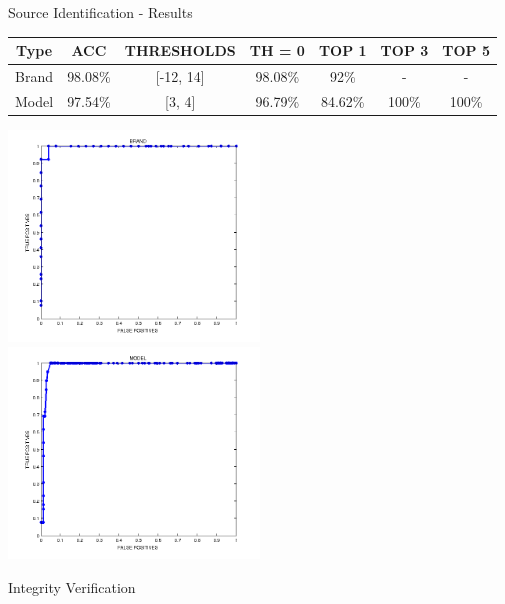 \begin{tframe}{Source Identification - Results}

\begin{footnotesize}
\begin{table}[h!]
\centering
\begin{tabular}{c c c c c c c} 
\hline \hline 
\textbf{Type} & \textbf{ACC} & \textbf{THRESHOLDS} & \textbf{TH = 0} & \textbf{TOP 1} & \textbf{TOP 3} & \textbf{TOP 5}\\ [0.5ex]
\hline

Brand & 98.08\% & [-12, 14] & 98.08\% & 92\% & - & - \\
Model & 97.54\% & [3, 4] & 96.79\% & 84.62\% & 100\% & 100\% \\

\hline
\end{tabular}
\end{table}
\end{footnotesize}

\vspace{0.1cm}
    
\includegraphics[width=0.5\textwidth]{images/brand-plot-label.png}
\includegraphics[width=0.5\textwidth]{images/model-plot-label.png}

\end{tframe}

\begin{tframe}{Integrity Verification}

\vspace{0.2cm}







\end{tframe}

